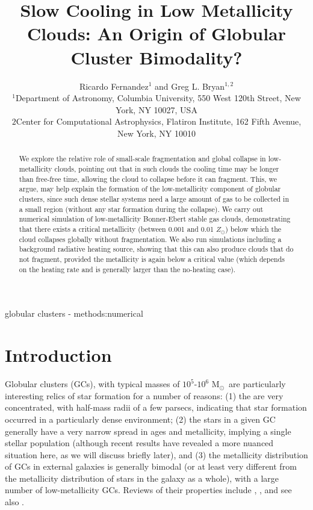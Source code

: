 \documentclass[useAMS,usenatbib]{mn2e}
\title{Slow Cooling in Low Metallicity Clouds: An Origin of Globular Cluster Bimodality?}
\author[R. Fernandez et al.]{Ricardo Fernandez$^{1}$ and Greg L. Bryan$^{1,2}$\\
$^{1}$Department of Astronomy, Columbia University, 550 West 120th Street, New York, NY 10027, USA \\
${2}$Center for Computational Astrophysics, Flatiron Institute, 162 Fifth Avenue, New York, NY 10010}
\newcommand{\msun}{{M$_\odot$}}
\begin{document}
\date{}


\maketitle


\begin{abstract}

We explore the relative role of small-scale fragmentation and global collapse in low-metallicity clouds, pointing out that in such clouds the cooling time may be longer than free-free time, allowing the cloud to collapse before it can fragment.  This, we argue, may help explain the formation of the low-metallicity component of globular clusters, since such dense stellar systems need a large amount of gas to be collected in a small region (without any star formation during the collapse).  We carry out numerical simulation of low-metallicity Bonner-Ebert stable gas clouds, demonstrating that there exists a critical metallicity (between 0.001 and 0.01 $Z_\odot$) below which the cloud collapses globally without fragmentation.  We also run simulations including a background radiative heating source, showing that this can also produce clouds that do not fragment, provided the metallicity is again below a critical value (which depends on the heating rate and is generally larger than the no-heating case).

\end{abstract}

\begin{keywords}
globular clusters - methods:numerical
\end{keywords}

%
\section{Introduction}

Globular clusters (GCs), with typical masses of $10^5$-$10^6$ \msun\ are particularly interesting relics of star formation for a number of reasons: (1) the are very concentrated, with half-mass radii of a few parsecs, indicating that star formation occurred in a particularly dense environment; (2) the stars in a given GC generally have a very narrow spread in ages and metallicity, implying a single stellar population (although recent results have revealed a more nuanced situation here, as we will discuss briefly later), and (3) the metallicity distribution of GCs in external galaxies is generally bimodal (or at least very different from the metallicity distribution of stars in the galaxy as a whole), with a large number of low-metallicity GCs.  Reviews of their properties include \citet{Brodie2006}, \citet{Renzini2008, Renzini2013}, and see also \cite{zwart2010}.
\end{document}
